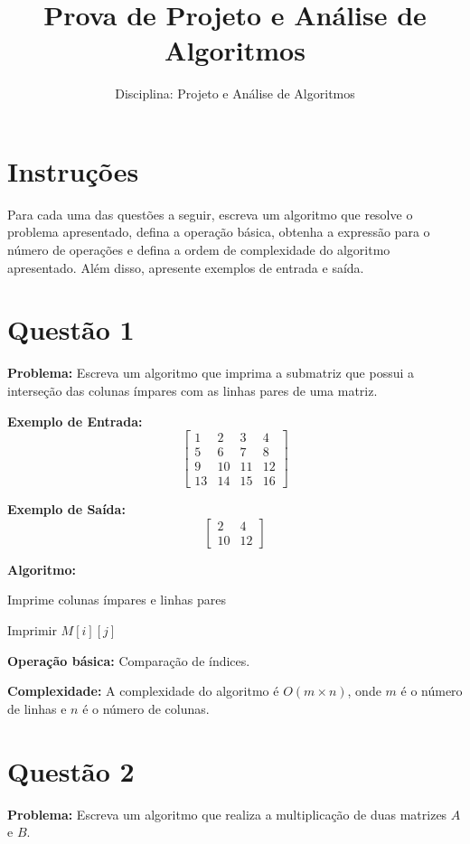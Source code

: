 \documentclass[12pt]{article}
\title{Prova de Projeto e Análise de Algoritmos}
\author{Disciplina: Projeto e Análise de Algoritmos}
\date{}
\begin{document}
\maketitle

\section*{Instruções}
Para cada uma das questões a seguir, escreva um algoritmo que resolve o problema apresentado, defina a operação básica, obtenha a expressão para o número de operações e defina a ordem de complexidade do algoritmo apresentado. Além disso, apresente exemplos de entrada e saída.

\section*{Questão 1}
\textbf{Problema:} Escreva um algoritmo que imprima a submatriz que possui a interseção das colunas ímpares com as linhas pares de uma matriz.

\textbf{Exemplo de Entrada:}
\[
\begin{bmatrix}
1 & 2 & 3 & 4 \\
5 & 6 & 7 & 8 \\
9 & 10 & 11 & 12 \\
13 & 14 & 15 & 16
\end{bmatrix}
\]

\textbf{Exemplo de Saída:}
\[
\begin{bmatrix}
2 & 4 \\
10 & 12
\end{bmatrix}
\]

\textbf{Algoritmo:}
\begin{algorithm}
\caption{Imprime colunas ímpares e linhas pares}
\begin{algorithmic}[1]
            \State Imprimir $M[i][j]$
        \EndFor
    \EndFor
\EndProcedure
\end{algorithmic}
\end{algorithm}

\textbf{Operação básica:} Comparação de índices.

\textbf{Complexidade:} A complexidade do algoritmo é $O(m \times n)$, onde $m$ é o número de linhas e $n$ é o número de colunas.

\newpage

\section*{Questão 2}
\textbf{Problema:} Escreva um algoritmo que realiza a multiplicação de duas matrizes \(A\) e \(B\).
\end{document}
